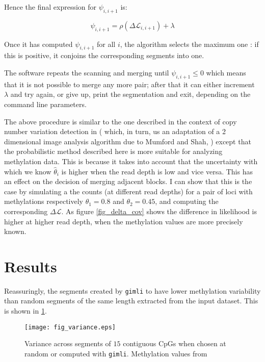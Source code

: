 \documentclass[12pt]{amsart}
\newcommand{\lik}{\ensuremath{\mathcal{L}}}
\newcommand{\gimli}{\texttt{gimli}}
\begin{document}
Hence the final expression for $\psi_{i,i+1}$ is:

\begin{equation}
\psi_{i,i+1} = \rho ( \Delta  \lik_{i,i+1}  )  +\lambda
\end{equation}

Once it has computed 
$\psi_{i,i+1}$ for all $i$, the algorithm selects the maximum 
one : if this is positive, it conjoins the corresponding segments into one.

The software repeats the scanning and merging until $\psi_{i,i+1} \leq 0$ 
which means that it is not possible to 
merge any more pair; after that it can either increment $\lambda$ and try again, 
or give up, print the segmentation and exit, depending on the command line parameters.

The above procedure is similar to the one
described in the context of copy number variation detection in \cite{vega} 
( which, in turn, us an adaptation 
of a 2 dimensional image analysis algorithm due to Mumford and Shah, 
\cite{mumfordshah}) except that the probabilistic method  described
here is more suitable for analyzing methylation data. This is because it takes into account 
that the
uncertainty with which we know $\hat{\theta}_i$ is higher when the read depth is low and vice versa.
This has an effect on the decision of merging adjacent blocks. I can show that this is the case by simulating
a the counts (at different read depths) for a pair of loci with methylations respectively 
$\theta_1=0.8$ and $\theta_2=0.45$,
and computing the corresponding $\Delta  \lik$.  
As figure \ref{fig_delta_cov} shows the difference in likelihood is higher at higher
read depth, when the methylation values are more precisely known.


\section{Results}

Reassuringly, the segments created by \gimli{} to have lower methylation
variability than random segments of the same length extracted from the input dataset. 
This is shown in \ref{fig_variance}.

\begin{figure}\label{fig_variance}
\texttt{[image: fig\_variance.eps]}
\caption{Variance across segments of $15$ contiguous CpGs when chosen at random or 
computed with \gimli{}. Methylation values from }
\end{figure}
\end{document}
